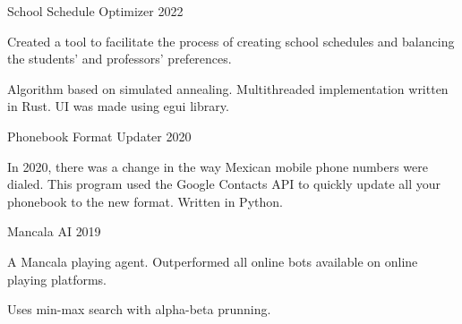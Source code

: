 \begin{cventries}

  \cventry
  {School Schedule Optimizer} %
  {} %
  {} %
  {2022} %
  {
    \begin{cvitems} %
      \item {Created a tool to facilitate the process of creating school schedules and balancing the students' and professors' preferences.}
      \item {Algorithm based on simulated annealing. Multithreaded implementation written in Rust. UI was made using egui library.}
    \end{cvitems}
  }

  \cventry
  {Phonebook Format Updater} %
  {} %
  {} %
  {2020} %
  {
    \begin{cvitems} %
      \item {In 2020, there was a change in the way Mexican mobile phone numbers were dialed. This program used the Google Contacts API to quickly update all your phonebook to the new format. Written in Python.}
    \end{cvitems}
  }

  \cventry
  {Mancala AI} %
  {} %
  {} %
  {2019} %
  {
    \begin{cvitems} %
      \item {A Mancala playing agent. Outperformed all online bots available on online playing platforms.}
      \item {Uses min-max search with alpha-beta prunning.}
    \end{cvitems}
  }


\end{cventries}
